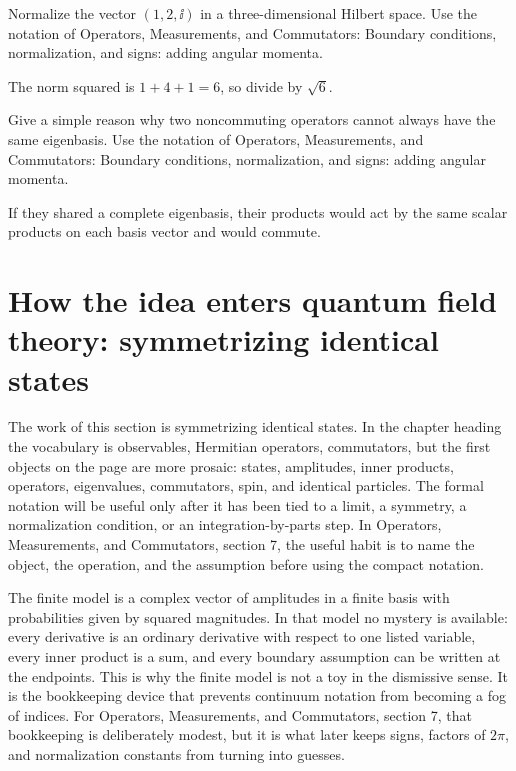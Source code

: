 \begin{exercise}
Normalize the vector \((1,2,\ii)\) in a three-dimensional Hilbert space.  Use the notation of Operators, Measurements, and Commutators: Boundary conditions, normalization, and signs: adding angular momenta.
\begin{answer}
The norm squared is \(1+4+1=6\), so divide by \(\sqrt6\).
\end{answer}
\end{exercise}

\begin{exercise}
Give a simple reason why two noncommuting operators cannot always have the same eigenbasis.  Use the notation of Operators, Measurements, and Commutators: Boundary conditions, normalization, and signs: adding angular momenta.
\begin{answer}
If they shared a complete eigenbasis, their products would act by the same scalar products on each basis vector and would commute.
\end{answer}
\end{exercise}



\section{How the idea enters quantum field theory: symmetrizing identical states}

The work of this section is symmetrizing identical states.  In the chapter heading the vocabulary is observables, Hermitian operators, commutators, but the first objects on the page are more prosaic: states, amplitudes, inner products, operators, eigenvalues, commutators, spin, and identical particles.  The formal notation will be useful only after it has been tied to a limit, a symmetry, a normalization condition, or an integration-by-parts step.  In Operators, Measurements, and Commutators, section 7, the useful habit is to name the object, the operation, and the assumption before using the compact notation.

The finite model is a complex vector of amplitudes in a finite basis with probabilities given by squared magnitudes.  In that model no mystery is available: every derivative is an ordinary derivative with respect to one listed variable, every inner product is a sum, and every boundary assumption can be written at the endpoints.  This is why the finite model is not a toy in the dismissive sense.  It is the bookkeeping device that prevents continuum notation from becoming a fog of indices.  For Operators, Measurements, and Commutators, section 7, that bookkeeping is deliberately modest, but it is what later keeps signs, factors of \(2\pi\), and normalization constants from turning into guesses.

